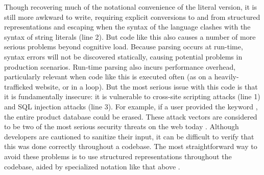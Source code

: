 Though recovering much of the notational convenience of the literal version, it is still more awkward to write, requiring explicit conversions to and from structured representations and escaping when the syntax of the language clashes with the syntax of string literals (line 2). But code like this also causes a number of more serious problems beyond cognitive load. Because parsing occurs at run-time, syntax errors will not be discovered statically, causing potential problems in production scenarios. Run-time parsing also incurs performance overhead, particularly relevant when code like this is executed often (as on a heavily-trafficked website, or in a loop). But the most serious issue with this code is that it is fundamentally insecure: it is vulnerable to cross-site scripting attacks (line 1) and SQL injection attacks (line 3). For example, if a user provided the keyword , the entire product database could be erased. These attack vectors are considered to be two of the most serious security threats on the web today \cite{owasp2013}. Although developers are cautioned to sanitize their input, it can be difficult to verify that this was done correctly throughout a codebase. The most straightforward way to avoid these problems is to use structured representations throughout the codebase, aided by specialized notation like that above \cite{Bravenboer:2007:PIA:1289971.1289975}.


